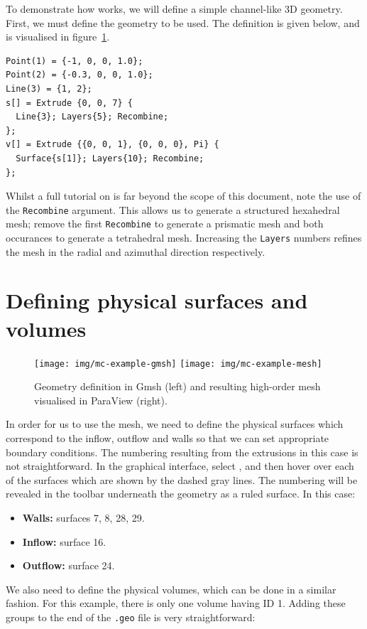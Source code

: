 To demonstrate how \nm works, we will define a simple channel-like 3D geometry.
First, we must define the \gmsh geometry to be used. The \gmsh definition is
given below, and is visualised in figure~\ref{fig:util:mc:gmsh-example}.

\begin{lstlisting}[style=XmlStyle]
Point(1) = {-1, 0, 0, 1.0};
Point(2) = {-0.3, 0, 0, 1.0};
Line(3) = {1, 2};
s[] = Extrude {0, 0, 7} {
  Line{3}; Layers{5}; Recombine;
};
v[] = Extrude {{0, 0, 1}, {0, 0, 0}, Pi} {
  Surface{s[1]}; Layers{10}; Recombine;
};
\end{lstlisting}

Whilst a full tutorial on \gmsh is far beyond the scope of this document, note
the use of the \texttt{Recombine} argument. This allows us to generate a
structured hexahedral mesh; remove the first \texttt{Recombine} to generate a
prismatic mesh and both occurances to generate a tetrahedral mesh. Increasing
the \texttt{Layers} numbers refines the mesh in the radial and azimuthal
direction respectively.

\section{Defining physical surfaces and volumes}

\begin{figure}
  \begin{center}
    \texttt{[image: img/mc-example-gmsh]}
    \texttt{[image: img/mc-example-mesh]}
  \end{center}
  \caption{Geometry definition in Gmsh (left) and resulting high-order mesh
    visualised in ParaView (right).}
  \label{fig:util:mc:gmsh-example}
\end{figure}

In order for us to use the mesh, we need to define the physical surfaces which
correspond to the inflow, outflow and walls so that we can set appropriate
boundary conditions. The numbering resulting from the extrusions in this case is
not straightforward. In the graphical interface, select , and then hover over each of the surfaces
which are shown by the dashed gray lines. The numbering will be revealed in the
toolbar underneath the geometry as a ruled surface. In this case:
%
\begin{itemize}
\item \textbf{Walls:} surfaces 7, 8, 28, 29.
\item \textbf{Inflow:} surface 16.
\item \textbf{Outflow:} surface 24.
\end{itemize}
%
We also need to define the physical volumes, which can be done in a similar
fashion. For this example, there is only one volume having ID 1. Adding these
groups to the end of the \texttt{.geo} file is very straightforward:

